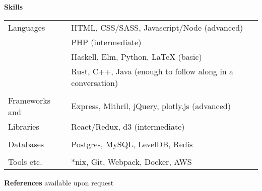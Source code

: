 \documentclass[notitlepage,oneside,draft]{article}
\begin{document}
\begin{flushleft}
  \large
  \textbf{Skills} \\
  \vspace{12pt}
  \normalsize
  \begin{tabular}{ p{86pt} | l  }
    Languages & HTML, CSS/SASS, Javascript/Node (advanced) \\
    & PHP (intermediate) \\
    & Haskell, Elm, Python, LaTeX (basic) \\
    & Rust, C++, Java (enough to follow along in a conversation) \\
    & \\
    Frameworks and & Express, Mithril, jQuery, plotly.js (advanced) \\
    Libraries & React/Redux, d3 (intermediate) \\
    & \\
    Databases & Postgres, MySQL, LevelDB, Redis \\
    & \\
    Tools etc. & *nix, Git, Webpack, Docker, AWS
  \end{tabular}
  \vspace{24pt}


  \large
  \textbf{References}
  \normalsize
  available upon request

\end{flushleft}
\end{document}
